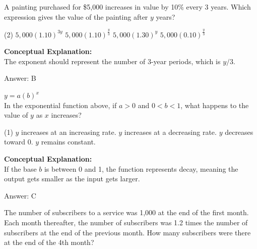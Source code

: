 \documentclass[11pt,paper=a4,answers]{exam}
\begin{document}
\begin{questions}
\question
A painting purchased for \$5,000 increases in value by 10\% every 3 years. Which expression gives the value of the painting after $y$ years?
\begin{tasks}(2)
    \task $5,000(1.10)^{3y}$
    \task $5,000(1.10)^{\frac{y}{3}}$
    \task $5,000(1.30)^y$
    \task $5,000(0.10)^{\frac{y}{3}}$
\end{tasks}

\begin{solution}
\textbf{Conceptual Explanation:} \\
The exponent should represent the number of 3-year periods, which is $y/3$.

\vspace{25pt}

Answer: \colorbox{yellow!100}{B}
\end{solution}

\vspace{40pt}

\question
$y = a(b)^x$ \\
In the exponential function above, if $a > 0$ and $0 < b < 1$, what happens to the value of $y$ as $x$ increases?
\begin{tasks}(1)
    \task $y$ increases at an increasing rate.
    \task $y$ increases at a decreasing rate.
    \task $y$ decreases toward 0.
    \task $y$ remains constant.
\end{tasks}

\begin{solution}
\textbf{Conceptual Explanation:} \\
If the base $b$ is between 0 and 1, the function represents decay, meaning the output gets smaller as the input gets larger.

\vspace{25pt}

Answer: \colorbox{yellow!100}{C}
\end{solution}

\vspace{40pt}

\question
The number of subscribers to a service was 1,000 at the end of the first month. Each month thereafter, the number of subscribers was 1.2 times the number of subscribers at the end of the previous month. How many subscribers were there at the end of the 4th month?


\end{questions}
\end{document}
